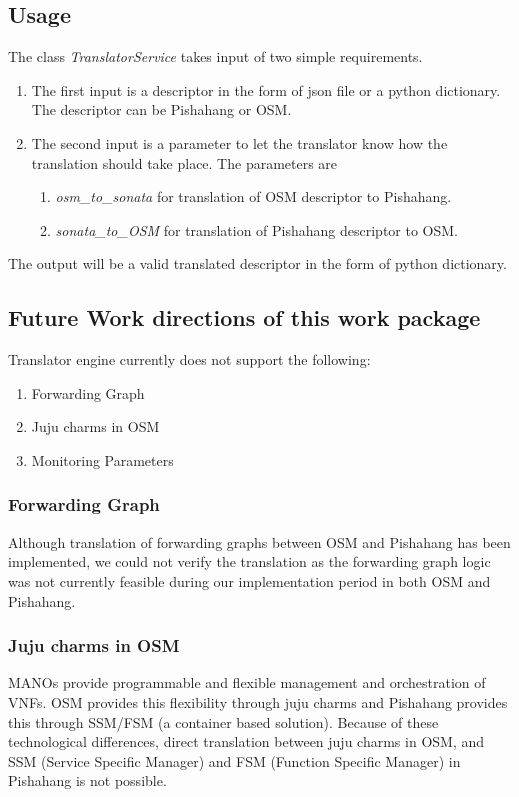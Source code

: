 \subsection{Usage}

The class \textit{TranslatorService} takes input of two simple requirements.
\begin{enumerate}
	\item The first input is a descriptor in the form of json file or a python dictionary. The descriptor can be Pishahang or OSM.
	\item The second input is a parameter to let the translator know how the translation should take place. The parameters are
	  \begin{enumerate}
	  	\item \textit{osm_to_sonata} for translation of OSM descriptor to Pishahang.
	  	\item \textit{sonata_to_OSM} for translation of Pishahang descriptor to OSM.
	  \end{enumerate}
\end{enumerate}

The output will be a valid translated descriptor in the form of python dictionary.

\subsection{Future Work directions of this work package}	

Translator engine currently does not support the following:
\begin{enumerate}
	\item Forwarding Graph
	\item Juju charms in OSM
	\item Monitoring Parameters
\end{enumerate}

\subsubsection{Forwarding Graph}
Although translation of forwarding graphs between OSM and  Pishahang has been implemented, we could not verify the translation as the forwarding graph logic was not currently feasible during our implementation period in both OSM and Pishahang.

\subsubsection{Juju charms in OSM}
MANOs provide programmable and flexible management and orchestration of VNFs. OSM provides this flexibility through juju charms and Pishahang provides this through SSM/FSM (a container based solution). Because of these technological differences, direct translation between juju charms in OSM, and SSM (Service Specific Manager) and FSM (Function Specific Manager) in Pishahang is not possible. 

